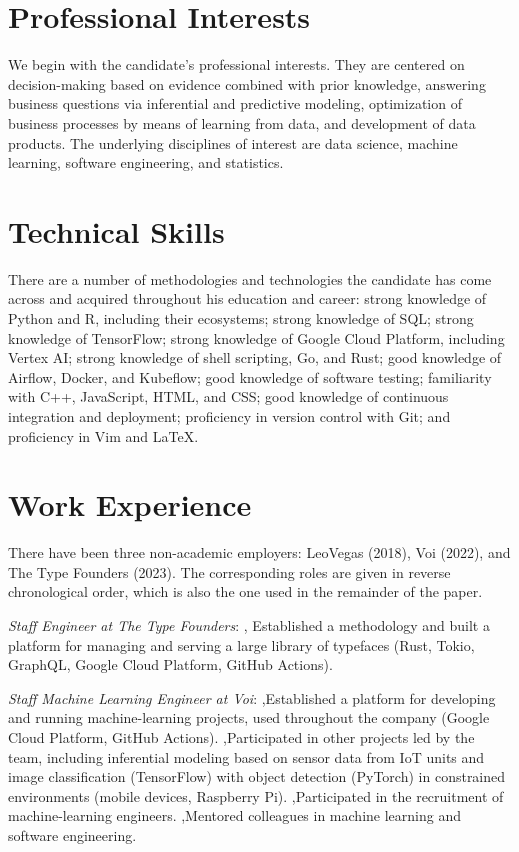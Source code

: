 \documentclass[journal]{IEEEtran}
\begin{document}
\section{Professional Interests} 

We begin with the candidate's professional interests. They are centered on
decision-making based on evidence combined with prior knowledge, answering
business questions via inferential and predictive modeling, optimization of
business processes by means of learning from data, and development of data
products. The underlying disciplines of interest are data science, machine
learning, software engineering, and statistics.

\section{Technical Skills} 

There are a number of methodologies and technologies the candidate has come
across and acquired throughout his education and career: strong knowledge of
Python and R, including their ecosystems; strong knowledge of SQL; strong
knowledge of TensorFlow; strong knowledge of Google Cloud Platform, including
Vertex AI; strong knowledge of shell scripting, Go, and Rust; good knowledge of
Airflow, Docker, and Kubeflow; good knowledge of software testing; familiarity
with C++, JavaScript, HTML, and CSS; good knowledge of continuous integration
and deployment; proficiency in version control with Git; and proficiency in Vim
and LaTeX.

\section{Work Experience} 

There have been three non-academic employers: LeoVegas (2018), Voi (2022), and
The Type Founders (2023). The corresponding roles are given in reverse
chronological order, which is also the one used in the remainder of the paper.

\date{February 2023--Present} \emph{Staff Engineer at The Type Founders}: \sep
Established a methodology and built a platform for managing and serving a large
library of typefaces (Rust, Tokio, GraphQL, Google Cloud Platform, GitHub
Actions).

\date{February 2022--January 2023} \emph{Staff Machine Learning Engineer at
Voi}: \sep Established a platform for developing and running machine-learning
projects, used throughout the company (Google Cloud Platform, GitHub Actions).
\sep Participated in other projects led by the team, including inferential
modeling based on sensor data from IoT units and image classification
(TensorFlow) with object detection (PyTorch) in constrained environments (mobile
devices, Raspberry Pi). \sep Participated in the recruitment of machine-learning
engineers. \sep Mentored colleagues in machine learning and software
engineering.
\end{document}
